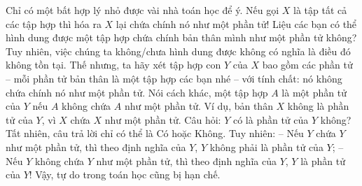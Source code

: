 \begin{multicols}{2}
	\vskip 0.1cm
	Chỉ có một bất hợp lý nhỏ được vài nhà toán học để ý. Nếu gọi $X$ là tập tất cả các tập hợp thì hóa ra $X$ lại chứa chính nó như một phần tử! Liệu các bạn có thể hình dung được một tập hợp chứa chính bản thân mình như một phần tử không? Tuy nhiên, việc chúng ta không/chưa hình dung được không có nghĩa là điều đó không tồn tại. 
	\vskip 0.1cm
	Thế nhưng, ta hãy xét tập hợp con $Y$ của $X$ bao gồm các phần tử -- mỗi phần tử bản thân là một tập hợp các bạn nhé -- với tính chất: nó không chứa chính nó như một phần tử. Nói cách khác, một tập hợp $A$ là một phần tử của $Y$ nếu $A$ không chứa $A$ như một phần tử.
	\vskip 0.1cm
	Ví dụ, bản thân $X$ không là phần tử của $Y$, vì $X$ chứa $X$ như một phần tử. 
	\vskip 0.1cm
	Câu hỏi: $Y$ có là phần tử của $Y$ không? 
	\vskip 0.1cm
	Tất nhiên, câu trả lời chỉ có thể là Có hoặc Không.
	\vskip 0.1cm
	Tuy nhiên:
	\vskip 0.1cm
	-- Nếu $Y$ chứa $Y$ như một phần tử, thì theo định nghĩa của $Y$, $Y$ không phải là phần tử của $Y$;
	\vskip 0.1cm
	-- Nếu $Y$ không chứa $Y$ như một phần tử, thì theo định nghĩa của $Y$, $Y$ là phần tử của $Y$!
	\vskip 0.1cm
	Vậy, tự do trong toán học cũng bị hạn chế.
\end{multicols}
